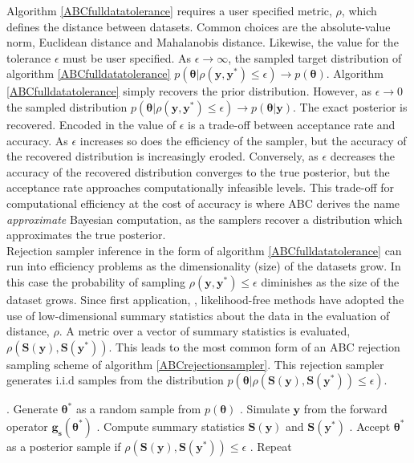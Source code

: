 Algorithm \ref{ABCfulldatatolerance} requires a user specified metric, $\rho$, which defines the distance between datasets. Common choices are the absolute-value norm, Euclidean distance and Mahalanobis distance. Likewise, the value for the tolerance $\epsilon$ must be user specified. As $\epsilon \rightarrow \infty$, the sampled target distribution of algorithm \ref{ABCfulldatatolerance} $p(\bm{\theta}|\rho(\bm{y},\bm{y^*})\leq\epsilon) \rightarrow p(\bm{\theta})$.  Algorithm \ref{ABCfulldatatolerance} simply recovers the prior distribution. However, as $\epsilon \rightarrow 0$ the sampled distribution $p(\bm{\theta}|\rho(\bm{y},\bm{y^*})\leq\epsilon) \rightarrow p(\bm{\theta}|\bm{y})$. The exact posterior is recovered. Encoded in the value of $\epsilon$ is a trade-off between acceptance rate and accuracy. As $\epsilon$ increases so does the efficiency of the sampler, but the accuracy of the recovered distribution is increasingly eroded. Conversely, as $\epsilon$ decreases the accuracy of the recovered distribution converges to the true posterior, but the acceptance rate approaches computationally infeasible levels. This trade-off for computational efficiency at the cost of accuracy is where ABC derives the name \textit{approximate} Bayesian computation, as the samplers recover a distribution which approximates the true posterior.\\

Rejection sampler inference in the form of algorithm \ref{ABCfulldatatolerance} can run into efficiency problems as the dimensionality (size) of the datasets grow. In this case the probability of sampling $\rho(\bm{y},\bm{y^*})\leq\epsilon$ diminishes as the size of the dataset grows. Since first application, \citet{Tavare1997}, likelihood-free methods have adopted the use of low-dimensional summary statistics about the data in the evaluation of distance, $\rho$. A metric over a vector of summary statistics is evaluated, $\rho(\bm{S}(\bm{y}),\bm{S}(\bm{y^*}))$. This leads to the most common form of an ABC rejection sampling scheme of algorithm \ref{ABCrejectionsampler}. This rejection sampler generates i.i.d samples from the distribution $p(\bm{\theta}|\rho(\bm{S}(\bm{y}),\bm{S}(\bm{y^*}))\leq\epsilon)$.

\begin{algorithm}[H]
	\caption{ }
	\begin{algorithmic}
		. Generate $\bm{\theta^*}$ as a random sample from $p(\bm{\theta})$		
		. Simulate $\bm{y}$ from the forward operator $\bm{g_s}(\bm{\theta^*})$		
		. Compute summary statistics $\bm{S}(\bm{y})$ and $\bm{S}(\bm{y^*})$		
		. Accept $\bm{\theta^*}$ as a posterior sample if $\rho(\bm{S}(\bm{y}),\bm{S}(\bm{y^*}))\leq\epsilon$		
		. Repeat
	\end{algorithmic}
	\label{ABCrejectionsampler}
\end{algorithm}

